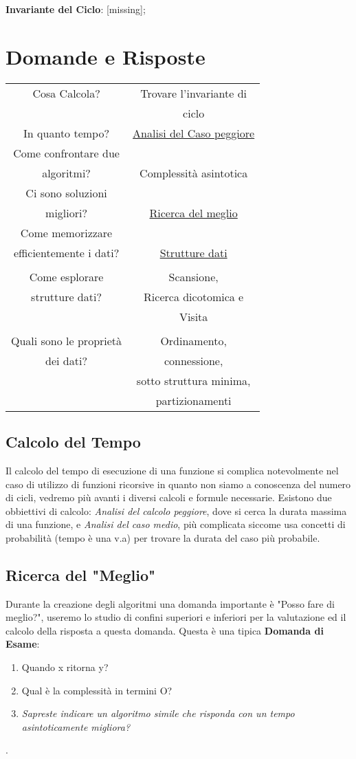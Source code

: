 \documentclass[twocolumn]{article}
\begin{document}
\textbf{Invariante del Ciclo}: [missing]; 

\section{Domande e Risposte}
\begin{tabular}{c|c}
    Cosa Calcola? & Trovare l'invariante di 
    \\ & ciclo \\
    In quanto tempo? & \hyperlink{tempo}{Analisi del Caso peggiore} \\
    Come confrontare due \\ algoritmi? & Complessità asintotica \\
    Ci sono soluzioni \\ migliori? & \hyperlink{meglio}{Ricerca del meglio} \\
    Come memorizzare \\ efficientemente i dati? & \hyperlink{dati}{Strutture dati} \\ 
      \\Come esplorare & Scansione, \\ strutture dati? &Ricerca dicotomica e \\ &Visita \\ \\
      Quali sono le proprietà & Ordinamento,\\ dei dati?&connessione,  \\ & sotto struttura minima,\\ & partizionamenti
\end{tabular}
\subsection{Calcolo del Tempo}
Il \hypertarget{tempo}{calcolo del tempo} di esecuzione di una funzione si complica notevolmente nel caso di utilizzo di funzioni ricorsive in quanto non siamo a conoscenza del numero di cicli, vedremo più avanti i diversi calcoli e formule necessarie. Esistono due obbiettivi di calcolo: \textit{Analisi del calcolo peggiore}, dove si cerca la durata massima di una funzione, e \textit{Analisi del caso medio}, più complicata siccome usa concetti di probabilità (tempo è una v.a) per trovare la durata del caso più probabile.

\subsection{Ricerca del "Meglio"}
Durante la creazione degli algoritmi una domanda importante è "\hypertarget{meglio}{Posso fare di meglio?}", useremo lo studio di confini superiori e inferiori per la valutazione ed il calcolo della risposta a questa domanda. Questa è una tipica \textbf{Domanda di Esame}: \begin{enumerate}
    \item Quando x ritorna y?
    \item Qual è la complessità in termini O?
    \item \textit{Sapreste indicare un algoritmo simile che risponda con un tempo asintoticamente migliora?}
\end{enumerate}.
\end{document}
